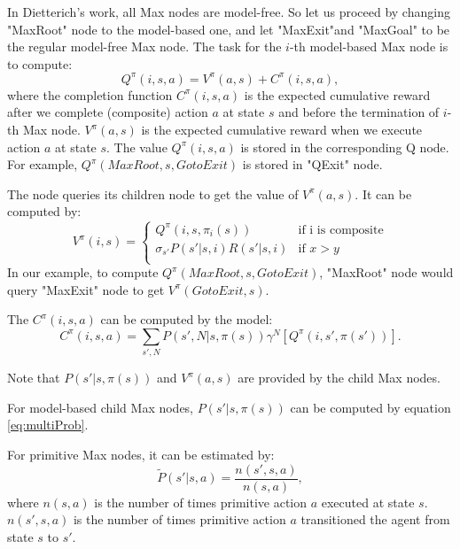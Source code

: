 In Dietterich's work, all Max nodes are model-free. 
So let us proceed by changing "MaxRoot" node to the model-based one, and let "MaxExit"and "MaxGoal"
to be the regular model-free Max node.
The task for the $i$-th model-based Max node is to compute:
\begin{equation}
    Q^{\pi}(i, s, a) = V^{\pi}(a, s) + C^{\pi}(i, s, a),
\end{equation}
where the completion function $C^{\pi}(i, s, a)$ is the expected cumulative reward after
we complete (composite) action $a$ at state $s$ and before the termination of $i$-th Max node.
$V^{\pi}(a, s)$ is the 
expected cumulative reward when we execute action $a$ at state $s$.
The value $Q^{\pi}(i, s, a)$ is stored in the corresponding Q node.
For example, $Q^{\pi}(MaxRoot, s, GotoExit)$ is stored in "QExit" node.

The node queries its children node to get the value of $V^{\pi}(a, s)$.
It can be computed by:
\begin{equation}
    V^{\pi}(i, s) = \left\{\begin{array}{ll}
                    Q^{\pi}(i, s, \pi_i(s)) & \mbox{if i is composite} \\
                    \sigma_{s'} P(s'|s, i)R(s'|s, i) & \mbox{if $x>y$} \\  
                    \end{array} \right.
    \label{eq:V}
\end{equation}
In our example, to compute $Q^{\pi}(MaxRoot, s, GotoExit)$, "MaxRoot" node would query 
"MaxExit" node to get $V^{\pi}(GotoExit, s)$.

The $C^{\pi}(i, s, a)$ can be computed by the model:
\begin{equation}
    C^{\pi}(i, s, a) = \sum_{s', N}P(s', N|s, \pi(s))\gamma^N[Q^{\pi}(i, s', \pi(s'))].
    \label{eq:C}
\end{equation}

Note that $P(s'|s, \pi(s))$ and $V^{\pi}(a, s)$ are provided by the child Max nodes.

For model-based child Max nodes, $P(s'|s, \pi(s))$ can be computed by equation \ref{eq:multiProb}.

For primitive Max nodes, it can be estimated by:
\begin{equation}
    \tilde{P}(s'|s, a)  = \frac{n(s', s, a)}{n(s, a)},
    \label{eq:countP}
\end{equation}
where $n(s, a)$ is the number of times primitive action $a$ executed 
at state $s$. $n(s', s, a)$ is the number of times primitive action $a$
transitioned the agent from state $s$ to $s'$.

